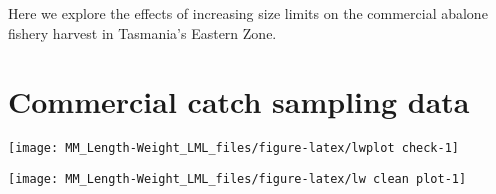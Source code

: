 \documentclass[
  11pt,
]{article}
\begin{document}
Here we explore the effects of increasing size limits on the commercial
abalone fishery harvest in Tasmania's Eastern Zone.

\section{Commercial catch sampling
data}\label{commercial-catch-sampling-data}

\begin{center}\texttt{[image: MM\_Length-Weight\_LML\_files/figure-latex/lwplot check-1]} \end{center}

\begin{center}\texttt{[image: MM\_Length-Weight\_LML\_files/figure-latex/lw clean plot-1]} \end{center}
\end{document}
